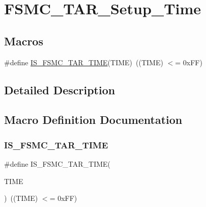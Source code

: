 \hypertarget{group___f_s_m_c___t_a_r___setup___time}{}\section{F\+S\+M\+C\+\_\+\+T\+A\+R\+\_\+\+Setup\+\_\+\+Time}
\label{group___f_s_m_c___t_a_r___setup___time}
\subsection*{Macros}
\begin{DoxyCompactItemize}
\item 
\#define \mbox{\hyperlink{group___f_s_m_c___t_a_r___setup___time_ga5b9e0f64c44ab68afca90cd28dedd8e3}{I\+S\+\_\+\+F\+S\+M\+C\+\_\+\+T\+A\+R\+\_\+\+T\+I\+ME}}(T\+I\+ME)~((T\+I\+ME) $<$= 0x\+F\+F)
\end{DoxyCompactItemize}


\subsection{Detailed Description}


\subsection{Macro Definition Documentation}
\mbox{\label{group___f_s_m_c___t_a_r___setup___time_ga5b9e0f64c44ab68afca90cd28dedd8e3}} 
\subsubsection{\texorpdfstring{IS\_FSMC\_TAR\_TIME}{IS\_FSMC\_TAR\_TIME}}
{\footnotesize\ttfamily \#define I\+S\+\_\+\+F\+S\+M\+C\+\_\+\+T\+A\+R\+\_\+\+T\+I\+ME(\begin{DoxyParamCaption}\item[{}]{T\+I\+ME }\end{DoxyParamCaption})~((T\+I\+ME) $<$= 0x\+F\+F)}

